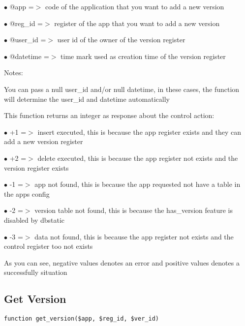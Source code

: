 \documentclass[a4paper]{book}
\begin{document}
\begin{compactitem}
\item[\color{myblue}$\bullet$] @app      =$>$ code of the application that you want to add a new version
\item[\color{myblue}$\bullet$] @reg\_id   =$>$ register of the app that you want to add a new version
\item[\color{myblue}$\bullet$] @user\_id  =$>$ user id of the owner of the version register
\item[\color{myblue}$\bullet$] @datetime =$>$ time mark used as creation time of the version register
\end{compactitem}

Notes:

You can pass a null user\_id and/or null datetime, in these cases, the
function will determine the user\_id and datetime automatically

This function returns an integer as response about the control action:

\begin{compactitem}
\item[\color{myblue}$\bullet$] +1 =$>$ insert executed, this is because the app register exists and they can add a new version register
\item[\color{myblue}$\bullet$] +2 =$>$ delete executed, this is because the app register not exists and the version register exists
\item[\color{myblue}$\bullet$] -1 =$>$ app not found, this is because the app requested not have a table in the apps config
\item[\color{myblue}$\bullet$] -2 =$>$ version table not found, this is because the has\_version feature is disabled by dbstatic
\item[\color{myblue}$\bullet$] -3 =$>$ data not found, this is because the app register not exists and the control register too not exists
\end{compactitem}

As you can see, negative values denotes an error and positive values denotes a successfully situation

\hypertarget{toc61}{}
\subsection{Get Version}

\begin{lstlisting}
function get_version($app, $reg_id, $ver_id)
\end{lstlisting}
\end{document}
